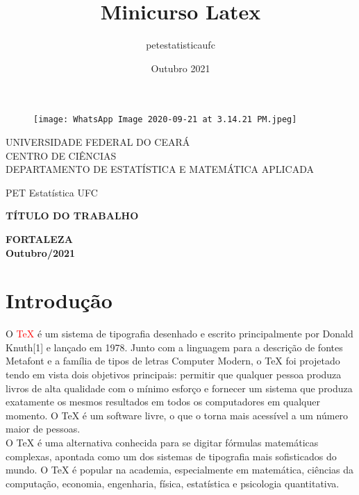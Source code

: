\documentclass[12pt]{article} %
\title{Minicurso Latex}
\author{petestatisticaufc }
\date{Outubro 2021}
\begin{document}
\thispagestyle{empty} %
\begin{center}
  \begin{figure} [h]
      \centering
      \texttt{[image: WhatsApp Image 2020-09-21 at 3.14.21 PM.jpeg]}
    
      \label{fig:my_label}
  \end{figure}
  
UNIVERSIDADE FEDERAL DO CEARÁ \\ %
CENTRO DE CIÊNCIAS \\
DEPARTAMENTO DE ESTATÍSTICA E MATEMÁTICA APLICADA\\

\vspace{2cm}

PET Estatística UFC\\

\vspace{4cm}

\textbf{TÍTULO DO TRABALHO} \\

\vspace{8cm}

\textbf{FORTALEZA}\\
\textbf{Outubro/2021}
    
\end{center}

\newpage %
\begin{center}
\tableofcontents %

\newpage
\listoftables %
\listoffigures %

\end{center}

\newpage
\section{Introdução}
\indent O \textcolor{red}{TeX} é um sistema de tipografia desenhado e escrito principalmente por Donald Knuth[1] e lançado em 1978. Junto com a linguagem para a descrição de fontes Metafont e a família de tipos de letras Computer Modern, o TeX foi projetado tendo em vista dois objetivos principais: permitir que qualquer pessoa produza livros de alta qualidade com o mínimo esforço e fornecer um sistema que produza exatamente os mesmos resultados em todos os computadores em qualquer momento. O TeX é um software livre, o que o torna mais acessível a um número maior de pessoas. \\ %
\indent O TeX é uma alternativa conhecida para se digitar fórmulas matemáticas complexas, apontada como um dos sistemas de tipografia mais sofisticados do mundo. O TeX é popular na academia, especialmente em matemática, ciências da computação, economia, engenharia, física, estatística e psicologia quantitativa.\\
\end{document}
